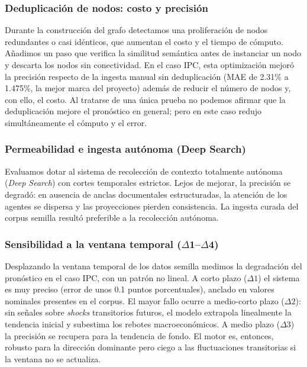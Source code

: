 \documentclass[11pt]{article}
\begin{document}
\subsubsection{Deduplicación de nodos: costo y precisión}

Durante la construcción del grafo detectamos una proliferación de nodos redundantes o casi idénticos, que aumentan el costo y el tiempo de cómputo. Añadimos un paso que verifica la similitud semántica antes de instanciar un nodo y descarta los nodos sin conectividad. En el caso IPC, esta optimización mejoró la precisión respecto de la ingesta manual sin deduplicación (MAE de 2.31\% a 1.475\%, la mejor marca del proyecto) además de reducir el número de nodos y, con ello, el costo. Al tratarse de una única prueba no podemos afirmar que la deduplicación mejore el pronóstico en general; pero en este caso redujo simultáneamente el cómputo y el error.

\subsubsection{Permeabilidad e ingesta autónoma (Deep Search)}

Evaluamos dotar al sistema de recolección de contexto totalmente autónoma (\textit{Deep Search}) con cortes temporales estrictos. Lejos de mejorar, la precisión se degradó: en ausencia de anclas documentales estructuradas, la atención de los agentes se dispersa y las proyecciones pierden consistencia. La ingesta curada del corpus semilla resultó preferible a la recolección autónoma.

\subsubsection{Sensibilidad a la ventana temporal (\texorpdfstring{$\Delta$1--$\Delta$4}{Delta 1-4})}

Desplazando la ventana temporal de los datos semilla medimos la degradación del pronóstico en el caso IPC, con un patrón no lineal. A corto plazo ($\Delta 1$) el sistema es muy preciso (error de unos 0.1 puntos porcentuales), anclado en valores nominales presentes en el corpus. El mayor fallo ocurre a medio-corto plazo ($\Delta 2$): sin señales sobre \textit{shocks} transitorios futuros, el modelo extrapola linealmente la tendencia inicial y subestima los rebotes macroeconómicos. A medio plazo ($\Delta 3$) la precisión se recupera para la tendencia de fondo. El motor es, entonces, robusto para la dirección dominante pero ciego a las fluctuaciones transitorias si la ventana no se actualiza.
\end{document}

